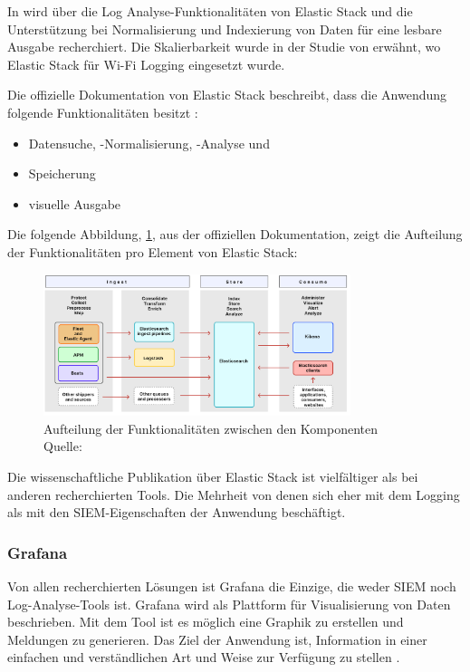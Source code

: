 In \citep{Advani_elkstakc} wird über die Log Analyse-Funktionalitäten von Elastic Stack und die Unterstützung bei Normalisierung und Indexierung von Daten für eine lesbare Ausgabe recherchiert. Die Skalierbarkeit wurde in der Studie von \citep{Wang_elkwifi} erwähnt, wo Elastic Stack für Wi-Fi Logging eingesetzt wurde. 

Die offizielle Dokumentation von Elastic Stack beschreibt, dass die Anwendung folgende Funktionalitäten besitzt \citep{elastic_docs}: 

\begin{itemize}[noitemsep]
   \item Datensuche, -Normalisierung, -Analyse und 
   \item Speicherung
   \item visuelle Ausgabe
\end{itemize}

Die folgende Abbildung, \ref{fig:ElasticKomponenten}, aus der offiziellen Dokumentation, zeigt die Aufteilung der Funktionalitäten pro Element von Elastic Stack:

\begin{figure}[H]
   \centering
   \includegraphics[width=0.8\textwidth]{assets/2_p9.png}
   \caption[Aufteilung der Funktionalitäten zwischen den Komponenten]
   {Aufteilung der Funktionalitäten zwischen den Komponenten\\Quelle: \citep{elastic_docs}}
   \label{fig:ElasticKomponenten}
   \centering
\end{figure}

Die wissenschaftliche Publikation über Elastic Stack ist vielfältiger als bei anderen recherchierten Tools. Die Mehrheit von denen sich eher mit dem Logging als mit den \gls{SIEM}-Eigenschaften der Anwendung beschäftigt.

\subsubsection{Grafana}
Von allen recherchierten Lösungen ist Grafana die Einzige, die weder \gls{SIEM} noch Log-Analyse-Tools ist. Grafana wird als Plattform für Visualisierung von Daten beschrieben. Mit dem Tool ist es möglich eine Graphik zu erstellen und Meldungen zu generieren. Das Ziel der Anwendung ist, Information in einer einfachen und verständlichen Art und Weise zur Verfügung zu stellen \citep{redhat_grafana}.  

